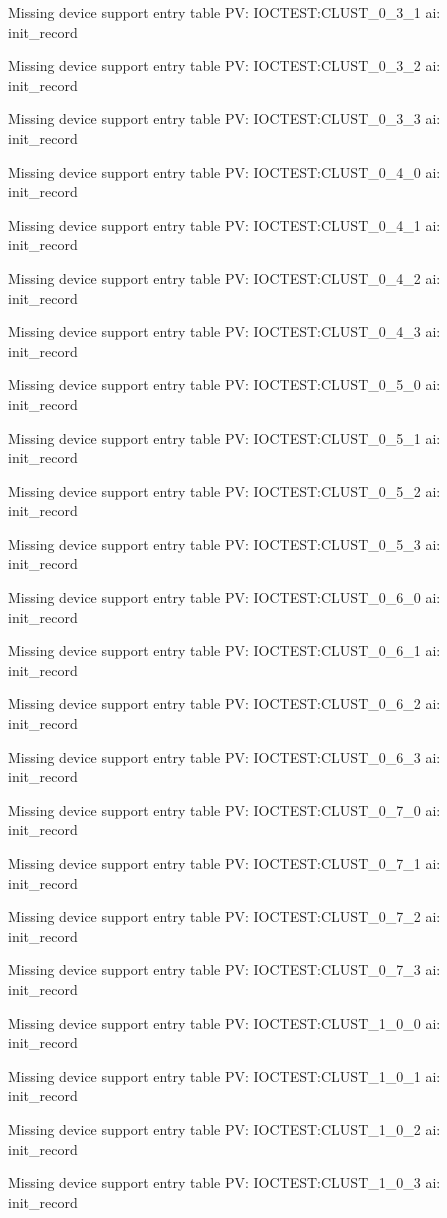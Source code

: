 Missing device support entry table PV: IOCTEST:CLUST_0_3_1 ai: init_record

Missing device support entry table PV: IOCTEST:CLUST_0_3_2 ai: init_record

Missing device support entry table PV: IOCTEST:CLUST_0_3_3 ai: init_record

Missing device support entry table PV: IOCTEST:CLUST_0_4_0 ai: init_record

Missing device support entry table PV: IOCTEST:CLUST_0_4_1 ai: init_record

Missing device support entry table PV: IOCTEST:CLUST_0_4_2 ai: init_record

Missing device support entry table PV: IOCTEST:CLUST_0_4_3 ai: init_record

Missing device support entry table PV: IOCTEST:CLUST_0_5_0 ai: init_record

Missing device support entry table PV: IOCTEST:CLUST_0_5_1 ai: init_record

Missing device support entry table PV: IOCTEST:CLUST_0_5_2 ai: init_record

Missing device support entry table PV: IOCTEST:CLUST_0_5_3 ai: init_record

Missing device support entry table PV: IOCTEST:CLUST_0_6_0 ai: init_record

Missing device support entry table PV: IOCTEST:CLUST_0_6_1 ai: init_record

Missing device support entry table PV: IOCTEST:CLUST_0_6_2 ai: init_record

Missing device support entry table PV: IOCTEST:CLUST_0_6_3 ai: init_record

Missing device support entry table PV: IOCTEST:CLUST_0_7_0 ai: init_record

Missing device support entry table PV: IOCTEST:CLUST_0_7_1 ai: init_record

Missing device support entry table PV: IOCTEST:CLUST_0_7_2 ai: init_record

Missing device support entry table PV: IOCTEST:CLUST_0_7_3 ai: init_record

Missing device support entry table PV: IOCTEST:CLUST_1_0_0 ai: init_record

Missing device support entry table PV: IOCTEST:CLUST_1_0_1 ai: init_record

Missing device support entry table PV: IOCTEST:CLUST_1_0_2 ai: init_record

Missing device support entry table PV: IOCTEST:CLUST_1_0_3 ai: init_record

